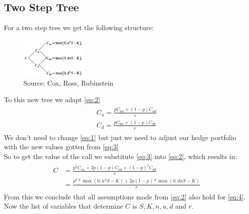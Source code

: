 \documentclass{article}
\DeclareMathOperator{\max}{max}
\begin{document}
\subsection{Two Step Tree}
For a two step tree we get the following structure:\\
\begin{figure}
\centering
\includegraphics[width=0.3\textwidth]{two_step_tree.png}
\caption{\label{fig:twostep}Source: Cox, Ross, Rubinstein}
\end{figure}
To this new tree we adapt \ref{eq:2}
\begin{align}\label{eq:3}
    \begin{split}
    C_{u} = \frac{p C_{uu} + (1-p) C_{ud}}{r} \\
    C_{d} = \frac{p C_{du} + (1-p) C_{dd}}{r}
    \end{split}
\end{align}
We don't need to change \ref{eq:1}  but just we need to adjust our hedge portfolio with the new values gotten from \ref{eq:3} \\
So to get the value of the call we substitute \ref{eq:3} into \ref{eq:2}, which results in:
\begin{align}\label{eq:4}
    \begin{split}
    C & = \frac{p^{2} C_{uu} + 2 p (1 - p)  C_{ud} + (1 - p)^{2}  C_{dd}}{r} \\
    & = \frac{p^{2}*\max(0, u^{2}S - K) + 2 p (1 - p) * \max(0, duS - K)}{r}
    \end{split}
\end{align}
From this we conclude that all assumptions made from \ref{eq:2} also hold for \ref{eq:4}. Now the list of variables that determine $C$ is $S, K, n, u, d$ and $r$.
\end{document}
